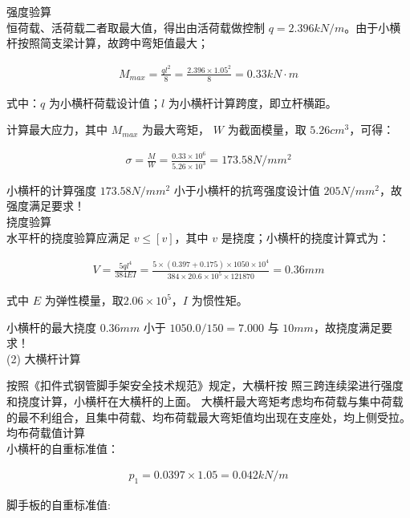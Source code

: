  强度验算\\

恒荷载、活荷载二者取最大值，得出由活荷载做控制 $q=2.396 kN/m$。由于小横杆按照简支梁计算，故跨中弯矩值最大；

\begin{align}
    M_{max}=\frac{ql^2}{8}=\frac{2.396\times 1.05^2}{8}=0.33 kN\cdot m
\end{align}

式中：$q$ 为小横杆荷载设计值；$l$ 为小横杆计算跨度，即立杆横距。

计算最大应力，其中 $M_{max}$ 为最大弯矩， $W$ 为截面模量，取 $5.26 cm^3$，可得：

\begin{align}
    \label{fx:load}
    \sigma =\frac{M}{W}=\frac{0.33\times 10^6}{5.26\times10^3}=173.58N/mm^2
\end{align}

小横杆的计算强度 $173.58N/mm^2$ 小于小横杆的抗弯强度设计值 $205N/mm^2$，故强度满足要求！\\

 挠度验算\\

水平杆的挠度验算应满足 $v\leq [v] $，其中 $v$ 是挠度；小横杆的挠度计算式为：

\begin{align}
    V=\frac{5ql^4}{384EI}=\frac{5\times (0.397+0.175)\times 1050\times 10^4}{384\times 20.6\times 10^5\times 121870}=0.36 mm
\end{align}

式中 $E$ 为弹性模量，取$2.06\times 10^5$，$I$ 为惯性矩。

小横杆的最大挠度 $0.36mm$ 小于 $1050.0/150=7.000$ 与 $10mm$，故挠度满足要求！ \\

(2) 大横杆计算

按照《扣件式钢管脚手架安全技术规范》规定，大横杆按
照三跨连续梁进行强度和挠度计算，小横杆在大横杆的上面。
大横杆最大弯矩考虑均布荷载与集中荷载的最不利组合，且集中荷载、均布荷载最大弯矩值均出现在支座处，均上侧受拉。\\

 均布荷载值计算\\

小横杆的自重标准值：

\begin{align}
    p_1=0.0397 \times 1.05=0.042 kN/m
\end{align}

脚手板的自重标准值:

